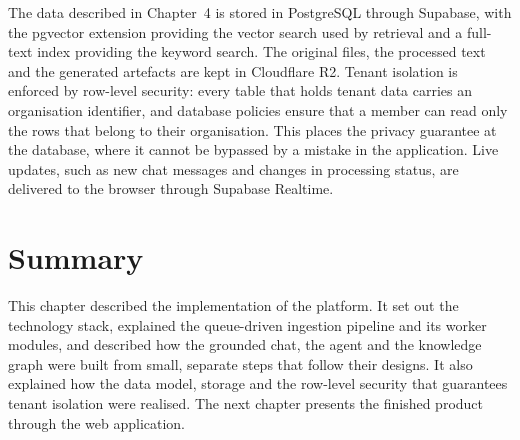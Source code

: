 The data described in Chapter~4 is stored in PostgreSQL through Supabase, with the
pgvector extension providing the vector search used by retrieval and a full-text
index providing the keyword search. The original files, the processed text and the
generated artefacts are kept in Cloudflare R2. Tenant isolation is enforced by
row-level security: every table that holds tenant data carries an organisation
identifier, and database policies ensure that a member can read only the rows that
belong to their organisation. This places the privacy guarantee at the database,
where it cannot be bypassed by a mistake in the application. Live updates, such as
new chat messages and changes in processing status, are delivered to the browser
through Supabase Realtime.

\section{Summary}

This chapter described the implementation of the platform. It set out the
technology stack, explained the queue-driven ingestion pipeline and its worker
modules, and described how the grounded chat, the agent and the knowledge graph
were built from small, separate steps that follow their designs. It also explained
how the data model, storage and the row-level security that guarantees tenant
isolation were realised. The next chapter presents the finished product through
the web application.
